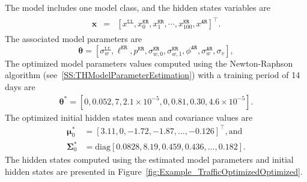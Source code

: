 The model includes one model class, and the hidden states variables are 
\begin{gather*}
\begin{array}{rcl}
\mathbf{x} &=& \left[x^{\mathtt{LL}}, x_{0}^{\mathtt{KR}}, x_{1}^{\mathtt{KR}},\cdots,x_{100}^{\mathtt{KR}}, x^{\mathtt{AR}}\right]^{\intercal}.
\end{array}
\end{gather*}
The associated model parameters are
\begin{equation}
\label{EQ:PTL}
\bm\theta = \left[\sigma^{\mathtt{LL}}_{w}, \ell^{\mathtt{KR}}, p^{\mathtt{KR}}, \sigma_{w,0}^{\mathtt{KR}}, \sigma_{w,1}^{\mathtt{KR}}, \phi^{\mathtt{AR}}, \sigma^{\mathtt{AR}}_{w}, \sigma_{v}\right],
\end{equation}
The optimized model parameters values computed using the Newton-Raphson algorithm (see~\ref{SS:THModelParameterEstimation}) with a training period of 14 days are
\begin{gather*}
\bm\theta^{\text{*}}=[0 , 0.052, 7, 2.1\times10^{-5}, 0, 0.81, 0.30, 4.6\times10^{-5}].
\end{gather*}
The optimized initial hidden states mean and covariance values are 
\begin{align*}
\bm \mu^{*}_{0} & = [	 3.11  ,	0  ,   	-1.72  ,	-1.87 ,	\dots, -0.126]^{\intercal}, \text{and} \\
\bm\Sigma^{*}_{0} & = \text{diag}[   0.0828,	8.19,  	0.459, 	0.436 , \dots, 0.182 ].
 \end{align*}
The hidden states computed using the estimated model parameters and initial hidden states are presented in Figure~\ref{fig:Example_TrafficOptimizedOptimized}.






